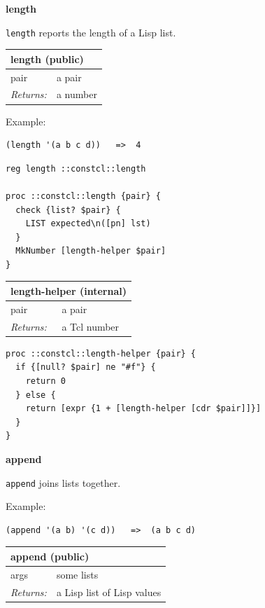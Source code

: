 \documentclass[twoside,9pt]{report}
\begin{document}
\textbf{length}


\texttt{length} reports the length of a Lisp list.

\begin{tabular}{ |l l| }
\hline
\multicolumn{2}{|l|}{length (public)} \\
\hline
pair & a pair \\
\textit{Returns:} & a number \\
\hline
\end{tabular}


Example:

\noindent\makebox[\linewidth]{\rule{\linewidth}{0.4pt}}
\begin{lstlisting}
(length '(a b c d))   =>  4
\end{lstlisting}
\noindent\makebox[\linewidth]{\rule{\linewidth}{0.4pt}}
\noindent\makebox[\linewidth]{\rule{\linewidth}{0.4pt}}
\begin{lstlisting}
reg length ::constcl::length
 
proc ::constcl::length {pair} {
  check {list? $pair} {
    LIST expected\n([pn] lst)
  }
  MkNumber [length-helper $pair]
}
\end{lstlisting}
\noindent\makebox[\linewidth]{\rule{\linewidth}{0.4pt}}
\begin{tabular}{ |l l| }
\hline
\multicolumn{2}{|l|}{length-helper (internal)} \\
\hline
pair & a pair \\
\textit{Returns:} & a Tcl number \\
\hline
\end{tabular}

\noindent\makebox[\linewidth]{\rule{\linewidth}{0.4pt}}
\begin{lstlisting}
proc ::constcl::length-helper {pair} {
  if {[null? $pair] ne "#f"} {
    return 0
  } else {
    return [expr {1 + [length-helper [cdr $pair]]}]
  }
}
\end{lstlisting}
\noindent\makebox[\linewidth]{\rule{\linewidth}{0.4pt}}

\textbf{append}


\texttt{append} joins lists together.


Example:

\noindent\makebox[\linewidth]{\rule{\linewidth}{0.4pt}}
\begin{lstlisting}
(append '(a b) '(c d))   =>  (a b c d)
\end{lstlisting}
\noindent\makebox[\linewidth]{\rule{\linewidth}{0.4pt}}
\begin{tabular}{ |l l| }
\hline
\multicolumn{2}{|l|}{append (public)} \\
\hline
args & some lists \\
\textit{Returns:} & a Lisp list of Lisp values \\
\hline
\end{tabular}
\end{document}

